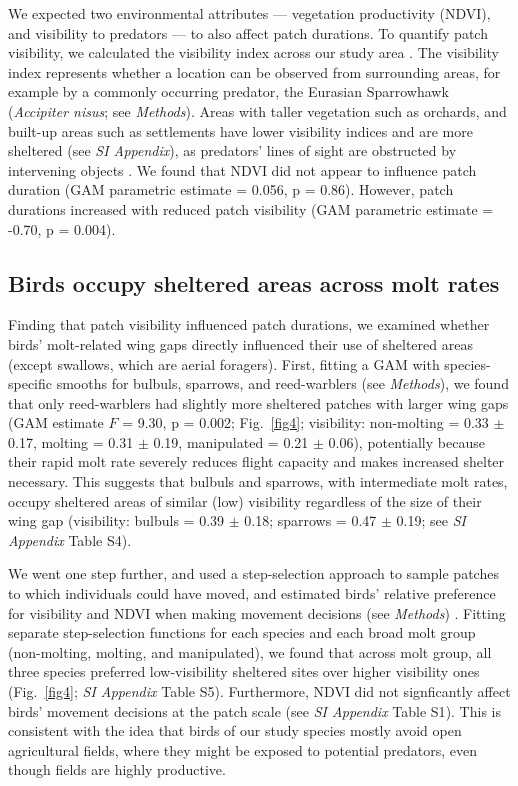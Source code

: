\begin{refsection}
We expected two environmental attributes --- vegetation productivity (NDVI), and visibility to predators --- to also affect patch durations.
To quantify patch visibility, we calculated the visibility index across our study area \cite{olsoy2015,aben2018,aben2021}.
The visibility index represents whether a location can be observed from surrounding areas, for example by a commonly occurring predator, the Eurasian Sparrowhawk (\textit{Accipiter nisus}; see \textit{Methods}).
Areas with taller vegetation such as orchards, and built-up areas such as settlements have lower visibility indices and are more sheltered (see \textit{SI Appendix}), as predators' lines of sight are obstructed by intervening objects \cite{olsoy2015}.
We found that NDVI did not appear to influence patch duration (GAM parametric estimate = 0.056, p = 0.86).
However, patch durations increased with reduced patch visibility (GAM parametric estimate = -0.70, p = 0.004).

\subsection*{Birds occupy sheltered areas across molt rates}

Finding that patch visibility influenced patch durations, we examined whether birds' molt-related wing gaps directly influenced their use of sheltered areas (except swallows, which are aerial foragers).
First, fitting a GAM with species-specific smooths for bulbuls, sparrows, and reed-warblers (see \textit{Methods}), we found that only reed-warblers had slightly more sheltered patches with larger wing gaps (GAM estimate $F$ = 9.30, p = 0.002; Fig.~\ref{fig4}; visibility: non-molting = 0.33 $\pm$ 0.17, molting = 0.31 $\pm$ 0.19, manipulated = 0.21 $\pm$ 0.06), potentially because their rapid molt rate severely reduces flight capacity and makes increased shelter necessary.
This suggests that bulbuls and sparrows, with intermediate molt rates, occupy sheltered areas of similar (low) visibility regardless of the size of their wing gap (visibility: bulbuls =  0.39 $\pm$ 0.18; sparrows = 0.47 $\pm$ 0.19; see \textit{SI Appendix} Table S4).

We went one step further, and used a step-selection approach to sample patches to which individuals could have moved, and estimated birds' relative preference for visibility and NDVI when making movement decisions (see \textit{Methods}) \citep{avgar2016,aben2021}.
Fitting separate step-selection functions for each species and each broad molt group (non-molting, molting, and manipulated), we found that across molt group, all three species preferred low-visibility sheltered sites over higher visibility ones (Fig.~\ref{fig4}; \textit{SI Appendix} Table S5).
Furthermore, NDVI did not signficantly affect birds' movement decisions at the patch scale (see \textit{SI Appendix} Table {S1}).
This is consistent with the idea that birds of our study species mostly avoid open agricultural fields, where they might be exposed to potential predators, even though fields are highly productive.


\end{refsection}
